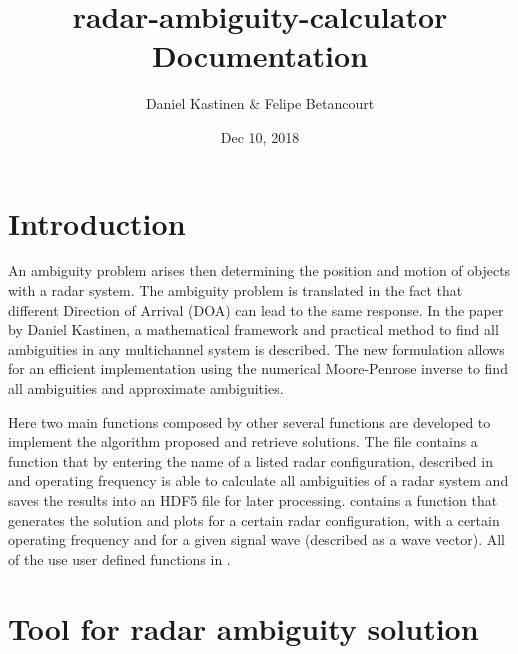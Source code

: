 \documentclass[letterpaper,10pt,english]{sphinxmanual}
\title{radar-ambiguity-calculator Documentation}
\date{Dec 10, 2018}
\author{Daniel Kastinen \& Felipe Betancourt}
\begin{document}
\maketitle
\sphinxtableofcontents
{}\label{\detokenize{index::doc}}



\chapter{Introduction}
\label{\detokenize{introduction:introduction}}\label{\detokenize{introduction::doc}}
An ambiguity problem arises then determining the position and motion of objects with a radar system. The ambiguity problem
is translated in the fact that different Direction of Arrival (DOA) can lead to the same response. In  the paper
 by Daniel Kastinen, a mathematical
framework and practical method to find all ambiguities in any multichannel system is described. The new formulation
allows for an efficient implementation using the numerical Moore-Penrose inverse to find all
ambiguities and approximate ambiguities.

Here two main functions composed by other several functions are developed to implement the algorithm proposed and
retrieve solutions. The  file contains a function that by entering the name of a listed radar
configuration, described in  and operating frequency is able to calculate all ambiguities of a radar
system and saves the results into an HDF5 file for later processing.  contains a function that
generates the solution and plots for a certain radar configuration, with a certain operating frequency and for a given
signal wave (described as a wave vector). All of the use user defined functions in .


\chapter{Tool for radar ambiguity solution}
\label{\detokenize{radar:module-ambiguity_calculator}}\label{\detokenize{radar:tool-for-radar-ambiguity-solution}}\label{\detokenize{radar::doc}}
\end{document}
